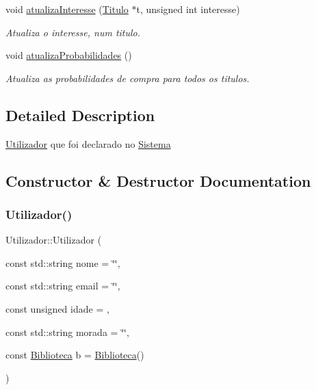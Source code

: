 \begin{DoxyCompactItemize}
void \hyperlink{classUtilizador_a4617169b0764e48f8b95d4d8aa12bf19}{atualiza\+Interesse} (\hyperlink{classTitulo}{Titulo} $\ast$t, unsigned int interesse)
\begin{DoxyCompactList}\small\item\em Atualiza o interesse, num titulo. \end{DoxyCompactList}\item 
void \hyperlink{classUtilizador_a82b216e27c9716cce49a7b98d59445cb}{atualiza\+Probabilidades} ()
\begin{DoxyCompactList}\small\item\em Atualiza as probabilidades de compra para todos os titulos. \end{DoxyCompactList}\end{DoxyCompactItemize}


\subsection{Detailed Description}
\hyperlink{classUtilizador}{Utilizador} que foi declarado no \hyperlink{classSistema}{Sistema} 

\subsection{Constructor \& Destructor Documentation}
\mbox{\label{classUtilizador_ac4d4e41d09c17ea0b1c5bf4bcda4b6a8}} 
\subsubsection{\texorpdfstring{Utilizador()}{Utilizador()}}
{\footnotesize\ttfamily Utilizador\+::\+Utilizador (\begin{DoxyParamCaption}\item[{const std\+::string}]{nome = {\ttfamily \char`\"{}\char`\"{}},  }\item[{const std\+::string}]{email = {\ttfamily \char`\"{}\char`\"{}},  }\item[{const unsigned}]{idade = {},  }\item[{const std\+::string}]{morada = {\ttfamily \char`\"{}\char`\"{}},  }\item[{const \hyperlink{classBiblioteca}{Biblioteca}}]{b = {\ttfamily \hyperlink{classBiblioteca}{Biblioteca}()} }\end{DoxyParamCaption})}



